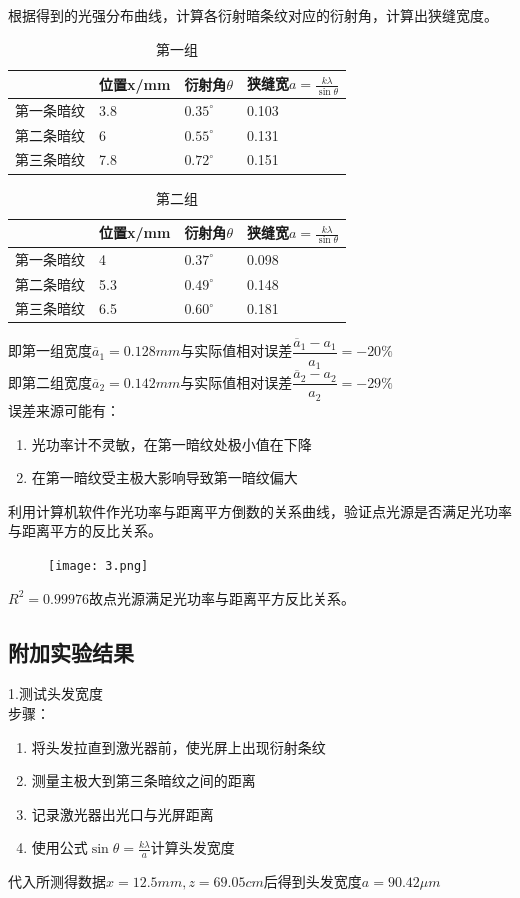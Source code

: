 \documentclass[dvipsnames, svgnames,a4paper,11pt]{article}
\begin{document}
\begin{question}
	根据得到的光强分布曲线，计算各衍射暗条纹对应的衍射角，计算出狭缝宽度。
	\tcblower
	\begin{table}[H]
		\centering
		\caption{第一组}
		\begin{tabular}{|l|l|l|l|}
		\hline
		&位置x/mm&衍射角$\theta$&狭缝宽$a=\frac{k\lambda}{\sin\theta}$\\
		\hline
		第一条暗纹&3.8&$0.35^\circ$&0.103\\
		\hline
		第二条暗纹&6&$0.55^\circ$&0.131\\
		\hline
		第三条暗纹&7.8&$0.72^\circ$&0.151\\
		\hline
		\end{tabular}
	\end{table}
	\begin{table}[H]
		\centering
		\caption{第二组}
		\begin{tabular}{|l|l|l|l|}
		\hline
		&位置x/mm&衍射角$\theta$&狭缝宽$a=\frac{k\lambda}{\sin\theta}$\\
		\hline
		第一条暗纹&4&$0.37^\circ$&0.098\\
		\hline
		第二条暗纹&5.3&$0.49^\circ$&0.148\\
		\hline
		第三条暗纹&6.5&$0.60^\circ$&0.181\\
		\hline
		\end{tabular}
	\end{table}
	即第一组宽度$\overline{a}_1=0.128mm$与实际值相对误差$\dfrac{\overline{a}_1-a_1}{a_1}=-20\%$\\
	即第二组宽度$\overline{a}_2=0.142mm$与实际值相对误差$\dfrac{\overline{a}_2-a_2}{a_2}=-29\%$\\
	误差来源可能有：\begin{enumerate}
		\item 光功率计不灵敏，在第一暗纹处极小值在下降
		\item 在第一暗纹受主极大影响导致第一暗纹偏大
	\end{enumerate}
\end{question}

\begin{question}
	利用计算机软件作光功率与距离平方倒数的关系曲线，验证点光源是否满足光功率与距离平方的反比关系。
	\tcblower
\begin{figure}[H]
	\texttt{[image: 3.png]}
\end{figure}
$R^2=0.99976$故点光源满足光功率与距离平方反比关系。
\end{question}
\subsection{附加实验结果}
\noindent 1.测试头发宽度\\
步骤：\begin{enumerate}
	\item 将头发拉直到激光器前，使光屏上出现衍射条纹
	\item 测量主极大到第三条暗纹之间的距离
	\item 记录激光器出光口与光屏距离
	\item 使用公式$\sin\theta=\frac{k\lambda}{a}$计算头发宽度
\end{enumerate}
代入所测得数据$x=12.5mm,z=69.05cm$后得到头发宽度$a=90.42\mu m$
\end{document}
